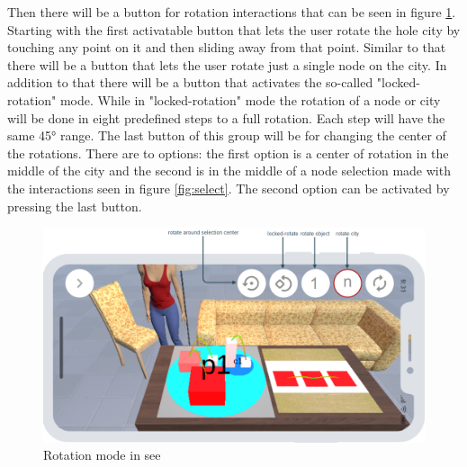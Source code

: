 Then there will be a button for rotation interactions that can be seen in figure \ref{fig:rotate}.
Starting with the first activatable button that lets the user rotate the hole \gls{city} by touching any point on it and then sliding away from that point.
Similar to that there will be a button that lets the user rotate just a single node on the \gls{city}.
In addition to that there will be a button that activates the so-called "locked-rotation" mode.
While in "locked-rotation" mode the rotation of a node or \gls{city} will be done in eight predefined steps to a full rotation.
Each step will have the same 45° range.
The last button of this group will be for changing the center of the rotations. 
There are to options: the first option is a center of rotation in the middle of the \gls{city} and the second is in the middle of a node selection made with the interactions seen in figure \ref{fig:select}.
The second option can be activated by pressing the last button.

\begin{figure}[htb]
    \centering
    \includegraphics[width=1\textwidth]{Concept/img/menu4.png}
    \caption{Rotation mode in \gls{see}}\label{fig:rotate}
\end{figure}


